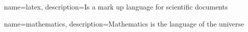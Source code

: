 {
    name=latex,
    description={Is a mark up language for scientific documents}
}

{
    name=mathematics,
    description={Mathematics is the language of the universe}
}

